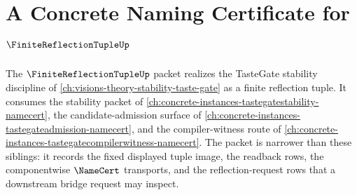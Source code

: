 \chapter{A Concrete Naming Certificate for $\FiniteReflectionTupleUp$}
\label{ch:concrete-instances-finitereflectiontuple-namecert}

The $\FiniteReflectionTupleUp$ packet realizes the TasteGate stability discipline of \autoref{ch:visions-theory-stability-taste-gate} as a finite reflection tuple. It consumes the stability packet of \autoref{ch:concrete-instances-tastegatestability-namecert}, the candidate-admission surface of \autoref{ch:concrete-instances-tastegateadmission-namecert}, and the compiler-witness route of \autoref{ch:concrete-instances-tastegatecompilerwitness-namecert}. The packet is narrower than these siblings: it records the fixed displayed tuple image, the readback rows, the componentwise $\NameCert$ transports, and the reflection-request rows that a downstream bridge request may inspect.


